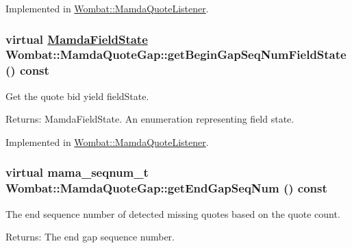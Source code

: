Implemented in \hyperlink{classWombat_1_1MamdaQuoteListener_d54593507488bdf2f07f532c4eb00549}{Wombat::Mamda\-Quote\-Listener}.\hypertarget{classWombat_1_1MamdaQuoteGap_3fef0c397fa74bb7bdd1102002869012}{
\subsubsection[getBeginGapSeqNumFieldState]{\setlength{\rightskip}{0pt plus 5cm}virtual \hyperlink{namespaceWombat_93aac974f2ab713554fd12a1fa3b7d2a}{Mamda\-Field\-State} Wombat::Mamda\-Quote\-Gap::get\-Begin\-Gap\-Seq\-Num\-Field\-State () const}}
\label{classWombat_1_1MamdaQuoteGap_3fef0c397fa74bb7bdd1102002869012}


Get the quote bid yield field\-State. 

\begin{Desc}
\item[Returns:]Mamda\-Field\-State. An enumeration representing field state. \end{Desc}


Implemented in \hyperlink{classWombat_1_1MamdaQuoteListener_7b146afc82cbcba47503e2720fd4ac5e}{Wombat::Mamda\-Quote\-Listener}.\hypertarget{classWombat_1_1MamdaQuoteGap_167d4cb258854b3665a5a7624824103d}{
\subsubsection[getEndGapSeqNum]{\setlength{\rightskip}{0pt plus 5cm}virtual mama\_\-seqnum\_\-t Wombat::Mamda\-Quote\-Gap::get\-End\-Gap\-Seq\-Num () const}}
\label{classWombat_1_1MamdaQuoteGap_167d4cb258854b3665a5a7624824103d}


The end sequence number of detected missing quotes based on the quote count. 

\begin{Desc}
\item[Returns:]The end gap sequence number. \end{Desc}


